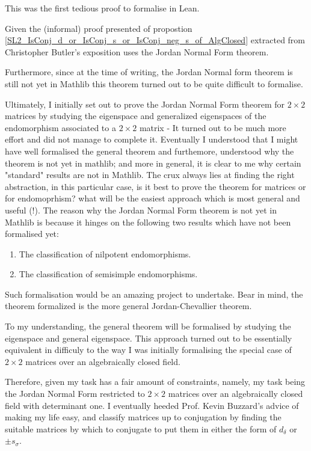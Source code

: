 \begin{remark}

This was the first tedious proof to formalise in Lean.

Given the (informal) proof presented of propostion \ref{SL2_IsConj_d_or_IsConj_s_or_IsConj_neg_s_of_AlgClosed} extracted from Christopher Butler's exposition uses the Jordan Normal Form theorem. 

Furthermore, since at the time of writing, the Jordan Normal form theorem is still not yet in Mathlib this theorem turned out to be quite difficult to formalise.

Ultimately, I initially set out to prove the Jordan Normal Form theorem for $2 \times 2$ matrices by studying the eigenspace and generalized eigenspaces of the endomorphism associated to a $2 \times 2$ matrix - It turned out to be much more effort and did not manage to complete it. 
Eventually I understood that I might have well formalised the general theorem and furthemore, understood why the theorem is not yet in mathlib; and more in general, it is clear to me why certain "standard" results are not in Mathlib. 
The crux always lies at finding the right abstraction, in this particular case, is it best to prove the theorem for matrices or for endomoprhism? what will be the easiest approach which is most general and useful (!).
The reason why the Jordan Normal Form theorem is not yet in Mathlib is because it hinges on the following two results which have not been formalised yet:

\begin{enumerate}
    \item The classification of nilpotent endomorphisms.
    \item The classification of semisimple endomorphisms.
\end{enumerate}

Such formalisation would be an amazing project to undertake. Bear in mind, the theorem formalized is the more general Jordan-Chevallier theorem.

To my understanding, the general theorem will be formalised by studying the eigenspace and general eigenspace. This approach turned out to be essentially equivalent in difficuly to the way I was initially formalising the special case of $2 \times 2$ matrices over an algebraically closed field.

Therefore, given my task has a fair amount of constraints, namely, my task being the Jordan Normal Form restricted to $2 \times 2$ matrices over an algebraically closed field with determinant one. I eventually heeded Prof. Kevin Buzzard's advice of making my life easy, and classify matrices up to conjugation 
by finding the suitable matrices by which to conjugate to put them in either the form of $d_\delta$ or $\pm s_\sigma$.
\end{remark}


